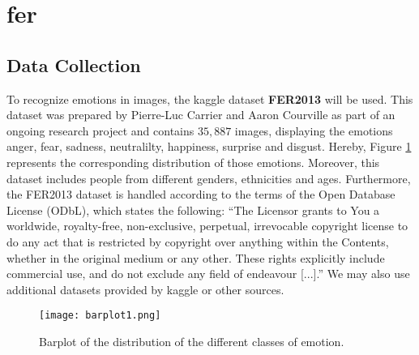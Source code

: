 \section{\acrlong{fer}}
\subsection{Data Collection}
To recognize emotions in images, the kaggle dataset \textbf{FER2013} \cite{FER2013} will be used. This dataset was prepared by Pierre-Luc Carrier and Aaron Courville as part of an ongoing research project and contains $35,887$ images, displaying the emotions anger, fear, sadness, neutralilty, happiness, surprise and disgust. Hereby, Figure \ref{fig:emo-distribution} represents the corresponding distribution of those emotions. Moreover, this dataset includes people from different genders, ethnicities and ages. Furthermore, the FER2013 dataset is handled according to the terms of the Open Database License (ODbL), which states the following: ``The Licensor grants to You a worldwide, royalty-free, non-exclusive, perpetual, irrevocable copyright license to do any act that is restricted by copyright over anything within the Contents, whether in the original medium or any other. These rights explicitly include commercial use, and do not exclude any field of endeavour [...].'' \cite{odbl} We may also use additional datasets provided by kaggle or other sources.

\begin{figure}[h!]
\centering
\texttt{[image: barplot1.png]}
\caption{Barplot of the distribution of the different classes of emotion.}\label{fig:emo-distribution}
\end{figure}

